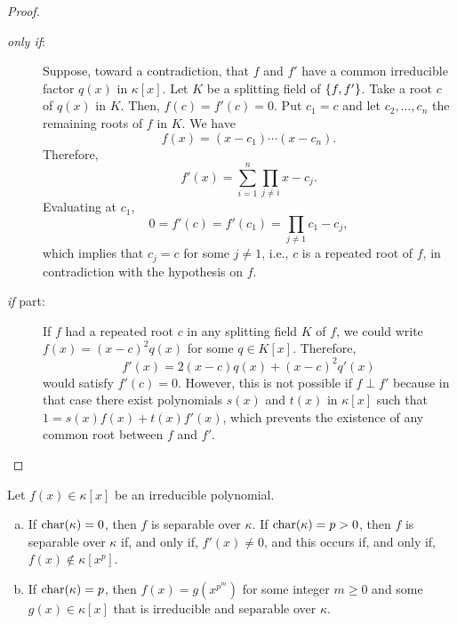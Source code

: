 \begin{proof}${}$
    \begin{description}
        \item[\rm\textit{only if\/}:] Suppose, toward a contradiction, that $f$ and $f'$ have a common irreducible factor $q(x)$ in $\kappa[x]$. Let $K$ be a splitting field of $\{f,f'\}$. Take a root $c$ of $q(x)$ in $K$. Then, $f(c)=f'(c)=0$. Put $c_1=c$ and let $c_2,\dots,c_n$ the remaining roots of $f$ in $K$. We have
        $$
            f(x) = (x-c_1)\cdots(x-c_n).
        $$
        Therefore,
        $$
            f'(x) = \sum_{i=1}^n\prod_{j\ne i}x-c_j.
        $$
        Evaluating at $c_1$,
        $$
            0 = f'(c) = f'(c_1)= \prod_{j\ne1}c_1-c_j,
        $$
        which implies that $c_j=c$ for some $j\ne1$, i.e., $c$ is a repeated root of $f$, in contradiction with the hypothesis on $f$.
        
        \item[\rm\textit{if\/} part:] If $f$ had a repeated root $c$ in any splitting field $K$ of $f$, we could write $f(x)=(x-c)^2q(x)$ for some $q\in K[x]$. Therefore,
        $$
            f'(x) = 2(x-c)q(x) + (x-c)^2q'(x)
        $$
        would satisfy $f'(c)=0$. However, this is not possible if $f\perp f'$ because in that case there exist polynomials $s(x)$ and $t(x)$ in $\kappa[x]$ such that $1=s(x)f(x)+t(x)f'(x)$, which prevents the existence of any common root between $f$ and $f'$.
        
    \end{description}
    
\end{proof}

\begin{prop}\label{prop:irreducible-separable-char-p}
    Let\/ $f(x) \in \kappa[x]$ be an irreducible polynomial.
    \begin{enumerate}[a), font=\upshape]
        \item If\/ $\operatorname{char}(\kappa) = 0$, then\/ $f$ is separable over\/ $\kappa$. If\/ $\operatorname{char}(\kappa) = p > 0$, then\/ $f$ is separable over\/ $\kappa$ if, and only if, $f'(x) \neq 0$, and this occurs if, and only if, $f(x) \not\in \kappa[x^p]$.
        
        \item If\/ $\operatorname{char}(\kappa) = p$, then\/ $f(x) = g(x^{p^m})$ for some integer\/ $m \ge 0$ and some\/ $g(x) \in \kappa[x]$ that is irreducible and separable over\/ $\kappa$.
    \end{enumerate}
\end{prop}

